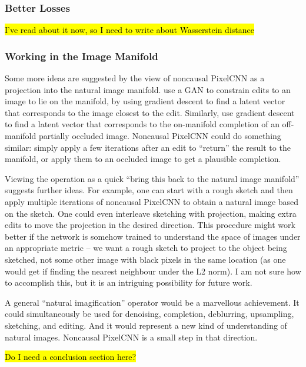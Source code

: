 \documentclass[11pt, a4paper]{book}
\newcommand{\nquote}[1]{``{#1}''}
\begin{document}
\subsubsection{Better Losses}

\hl{I've read about it now, so I need to write about Wasserstein distance}

\subsubsection{Working in the Image Manifold}

Some more ideas are suggested by the view of noncausal PixelCNN as a projection into the natural image manifold. \citet{manifoldmanipulation} use a GAN to constrain edits to an image to lie on the manifold, by using gradient descent to find a latent vector that corresponds to the image closest to the edit. Similarly, \citet{imageinpainting} use gradient descent to find a latent vector that corresponds to the on-manifold completion of an off-manifold partially occluded image. Noncausal PixelCNN could do something similar: simply apply a few iterations after an edit to \nquote{return} the result to the manifold, or apply them to an occluded image to get a plausible completion.

Viewing the operation as a quick \nquote{bring this back to the natural image manifold} suggests further ideas. For example, one can start with a rough sketch and then apply multiple iterations of noncausal PixelCNN to obtain a natural image based on the sketch. One could even interleave sketching with projection, making extra edits to move the projection in the desired direction. This procedure might work better if the network is somehow trained to understand the space of images under an appropriate metric -- we want a rough sketch to project to the object being sketched, not some other image with black pixels in the same location (as one would get if finding the nearest neighbour under the L2 norm). I am not sure how to accomplish this, but it is an intriguing possibility for future work.

A general \nquote{natural imagification} operator would be a marvellous achievement. It could simultaneously be used for denoising, completion, deblurring, upsampling, sketching, and editing. And it would represent a new kind of understanding of natural images. Noncausal PixelCNN is a small step in that direction.

\hl{Do I need a conclusion section here?}






\backmatter




\printindex
\end{document}
